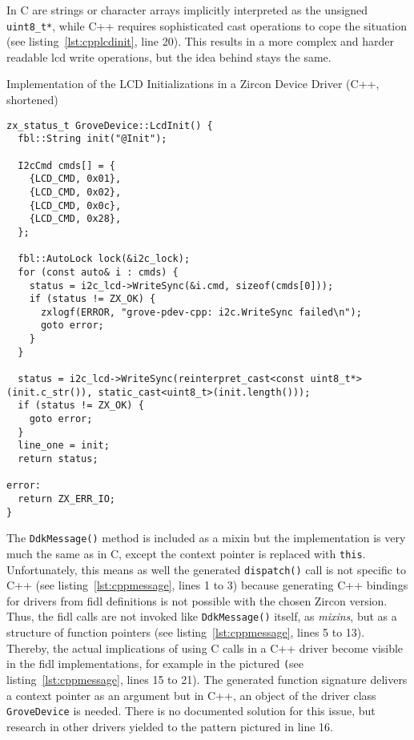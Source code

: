 In C are strings or character arrays implicitly interpreted as the unsigned \texttt{uint8_t*}, while C++ requires sophisticated cast operations to cope the situation (see listing~\ref{lst:cpplcdinit}, line 20).
This results in a more complex and harder readable \ac{lcd} write operations, but the idea behind stays the same.
%
\begin{listing} [H]
    \caption{Implementation of the LCD Initializations in a Zircon Device Driver (C++, shortened)}
\label{lst:cpplcdinit}
\begin{verbatim}
zx_status_t GroveDevice::LcdInit() {
  fbl::String init("@Init");

  I2cCmd cmds[] = {
    {LCD_CMD, 0x01},
    {LCD_CMD, 0x02},
    {LCD_CMD, 0x0c},
    {LCD_CMD, 0x28},
  };

  fbl::AutoLock lock(&i2c_lock);
  for (const auto& i : cmds) {
    status = i2c_lcd->WriteSync(&i.cmd, sizeof(cmds[0]));
    if (status != ZX_OK) {
      zxlogf(ERROR, "grove-pdev-cpp: i2c.WriteSync failed\n");
      goto error;
    }
  }

  status = i2c_lcd->WriteSync(reinterpret_cast<const uint8_t*>(init.c_str()), static_cast<uint8_t>(init.length()));
  if (status != ZX_OK) {
    goto error;
  }
  line_one = init;
  return status;

error:
  return ZX_ERR_IO;
}
\end{verbatim}
\end{listing}
%
The \texttt{DdkMessage()} method is included as a mixin but the implementation is very much the same as in C, except the context pointer is replaced with \texttt{this}.
Unfortunately, this means as well the generated \texttt{dispatch()} call is not specific to C++ (see listing~\ref{lst:cppmessage}, lines 1 to 3) because generating C++ bindings for drivers from \ac{fidl} definitions is not possible with the chosen Zircon version.
Thus, the \ac{fidl} calls are not invoked like \texttt{DdkMessage()} itself, as \textit{mixins}, but as a structure of function pointers (see listing~\ref{lst:cppmessage}, lines 5 to 13).
Thereby, the actual implications of using C calls in a C++ driver become visible in the \ac{fidl} implementations, for example in the pictured \texttt (see listing~\ref{lst:cppmessage}, lines 15 to 21).
The generated function signature delivers a context pointer as an argument but in C++, an object of the driver class \texttt{GroveDevice} is needed.
There is no documented solution for this issue, but research in other drivers yielded to the pattern pictured in line 16.
